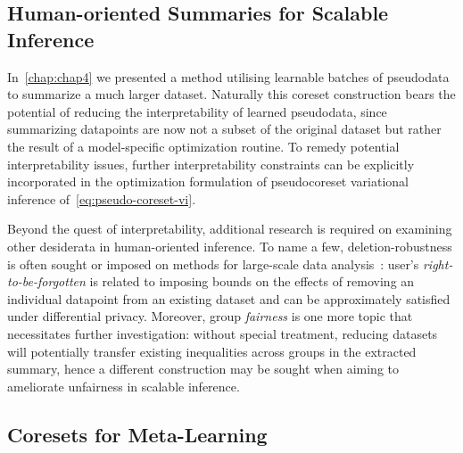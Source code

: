 \subsection{Human-oriented Summaries for Scalable Inference}
\label{subsec:human-oriented-pseudodata}

In~\cref{chap:chap4} we presented a method utilising learnable batches of pseudodata to summarize a much larger dataset. Naturally this coreset construction bears the potential of reducing the interpretability of learned pseudodata, since summarizing datapoints are now not a subset of the original dataset but rather the result of a model-specific optimization routine. To remedy potential interpretability issues, further interpretability constraints can be explicitly incorporated in the optimization formulation of pseudocoreset variational inference of~\cref{eq:pseudo-coreset-vi}.

Beyond the quest of interpretability, additional research is required on examining other desiderata in human-oriented inference. To name a few, deletion-robustness is often sought or imposed on methods for large-scale data analysis~\citep{mirzasoleiman17, ginart19}: user's \emph{right-to-be-forgotten} is related to imposing bounds on the effects of removing an individual datapoint from an existing dataset and can be approximately satisfied under differential privacy. Moreover, group \emph{fairness} is one more topic that necessitates further investigation: without special treatment, reducing datasets will potentially transfer existing inequalities across groups in the extracted summary, hence a different construction may be sought when aiming to ameliorate unfairness in scalable inference.  

\subsection{Coresets for Meta-Learning}
\label{subsec:metacoresets}